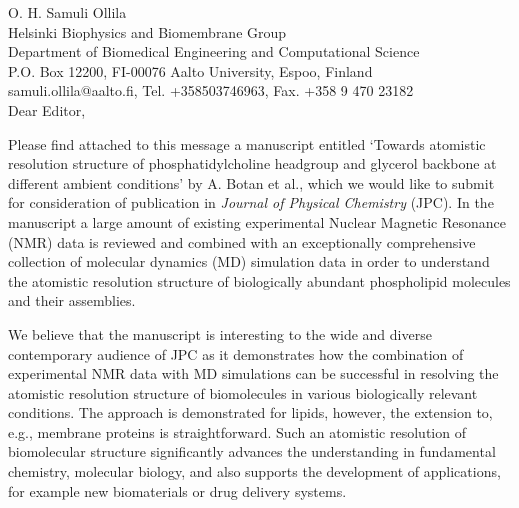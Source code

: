 \documentclass[11pt]{letter}
\begin{document}
\reversemarginpar
\pagestyle{empty}
\noindent O. H. Samuli Ollila \\
\noindent Helsinki Biophysics and Biomembrane Group\\
\noindent Department of Biomedical Engineering and Computational Science\\
\noindent P.O. Box 12200, FI-00076 Aalto University, Espoo, Finland\\
\noindent samuli.ollila@aalto.fi, Tel. +358503746963, Fax. +358 9 470 23182 \\


%
%

Dear Editor,

Please find attached to this message a manuscript entitled `Towards atomistic resolution structure of phosphatidylcholine 
headgroup and glycerol backbone at different ambient conditions' by A. Botan et al., which we would like to submit 
for consideration of publication in \textit{Journal of Physical Chemistry} (JPC). In the manuscript a large amount of
existing experimental Nuclear Magnetic Resonance (NMR) data is reviewed and combined with an exceptionally comprehensive 
collection of molecular dynamics (MD) simulation data in order to understand the atomistic resolution structure 
of biologically abundant phospholipid molecules and their assemblies.

We believe that the manuscript is interesting to the wide and diverse contemporary audience of
JPC as it demonstrates how the combination of experimental NMR data with MD simulations can 
be successful in resolving the atomistic resolution structure of biomolecules in various biologically 
relevant conditions. The approach is demonstrated for lipids, however, the extension to, e.g., membrane 
proteins is straightforward. Such an atomistic resolution of biomolecular structure significantly advances 
the understanding in fundamental chemistry, molecular biology, and also supports the development of applications, 
for example new biomaterials or drug delivery systems. 
\end{document}
